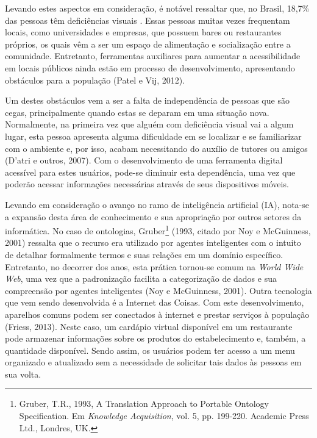 Levando estes aspectos em consideração, é notável ressaltar que, no Brasil, 18,7\% das pessoas têm deficiências visuais \cite{IBGE2011}. Essas pessoas muitas vezes frequentam locais, como universidades e empresas, que possuem bares ou restaurantes próprios, os quais vêm a ser um espaço de alimentação e socialização entre a comunidade. Entretanto, ferramentas auxiliares para aumentar a acessibilidade em locais públicos ainda estão em processo de desenvolvimento, apresentando obstáculos para a população (Patel e Vij, 2012)\nocite{PATEL2012}.

Um destes obstáculos vem a ser a falta de independência de pessoas que são cegas, principalmente quando estas se deparam em uma situação nova. Normalmente, na primeira vez que alguém com deficiência visual vai a algum lugar, esta pessoa apresenta alguma dificuldade em se localizar e se familiarizar com o ambiente e, por isso, acabam necessitando do auxílio de tutores ou amigos (D’atri e outros, 2007)\nocite{DATRI2007}. Com o desenvolvimento de uma ferramenta digital acessível para estes usuários, pode-se diminuir esta dependência, uma vez que poderão acessar informações necessárias através de seus dispositivos móveis.

Levando em consideração o avanço no ramo de inteligência artificial (IA), nota-se a expansão desta área de conhecimento e sua apropriação por outros setores da informática. No caso de ontologias, Gruber\footnote{Gruber, T.R., 1993,  A Translation Approach to Portable Ontology Specification. Em \emph{Knowledge Acquisition}, vol. 5, pp. 199-220. Academic Press Ltd., Londres, UK.} (1993, citado por Noy e McGuinness, 2001) ressalta que o recurso era utilizado por agentes inteligentes com o intuito de detalhar formalmente termos e suas relações em um domínio específico. Entretanto, no decorrer dos anos, esta prática tornou-se comum na \textit{World Wide Web}, uma vez que a padronização facilita a categorização de dados e sua compreensão por agentes inteligentes (Noy e McGuinness, 2001)\nocite{NOY2001}. Outra tecnologia que vem sendo desenvolvida é a Internet das Coisas. Com este desenvolvimento, aparelhos comuns podem ser conectados à internet e prestar serviços à população (Friess, 2013). Neste caso, um cardápio virtual disponível em um restaurante pode armazenar informações sobre os produtos do estabelecimento e, também, a quantidade disponível. Sendo assim, os usuários podem ter acesso a um menu organizado e atualizado sem a necessidade de solicitar tais dados às pessoas em sua volta.


